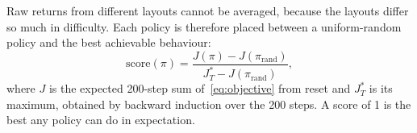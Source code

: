 Raw returns from different layouts cannot be averaged, because the layouts differ so much in difficulty. Each policy is therefore placed between a uniform-random policy and the best achievable behaviour:
\begin{equation}
\text{score}(\pi) = \frac{J(\pi) - J(\pi_{\text{rand}})}{J^\ast_T - J(\pi_{\text{rand}})} ,
\label{eq:score}
\end{equation}
where $J$ is the expected 200-step sum of~\eqref{eq:objective} from reset and $J^\ast_T$ is its maximum, obtained by backward induction over the 200 steps. A score of 1 is the best any policy can do in expectation.
